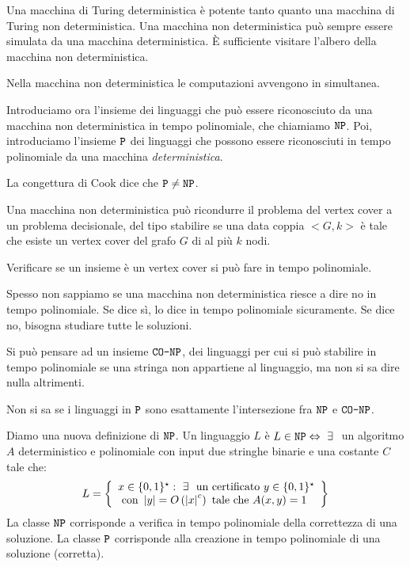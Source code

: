 Una macchina di Turing deterministica \`e potente tanto quanto una macchina di Turing non deterministica. Una macchina non deterministica pu\`o sempre essere simulata da una macchina deterministica. \`E sufficiente visitare l'albero della macchina non deterministica.

Nella macchina non deterministica le computazioni avvengono in simultanea.

Introduciamo ora l'insieme dei linguaggi che pu\`o essere riconosciuto da una macchina non deterministica in tempo polinomiale, che chiamiamo $\texttt{NP}$. Poi, introduciamo l'insieme $\texttt{P}$ dei linguaggi che possono essere riconosciuti in tempo polinomiale da una macchina \emph{deterministica}.

La congettura di Cook dice che $\texttt{P} \neq \texttt{NP}$.

Una macchina non deterministica pu\`o ricondurre il problema del vertex cover a un problema decisionale, del tipo stabilire se una data coppia $<G,k>$ \`e tale che esiste un vertex cover del grafo $G$ di al pi\`u $k$ nodi.

Verificare se un insieme \`e un vertex cover si pu\`o fare in tempo polinomiale.

Spesso non sappiamo se una macchina non deterministica riesce a dire no in tempo polinomiale. Se dice s\`i, lo dice in tempo polinomiale sicuramente. Se dice no, bisogna studiare tutte le soluzioni.

Si pu\`o pensare ad un insieme $\texttt{CO-NP}$, dei linguaggi per cui si pu\`o stabilire in tempo polinomiale se una stringa non appartiene al linguaggio, ma non si sa dire nulla altrimenti.

Non si sa se i linguaggi in $\texttt{P}$ sono esattamente l'intersezione fra $\texttt{NP}$ e $\texttt{CO-NP}$.

Diamo una nuova definizione di $\texttt{NP}$. Un linguaggio $L$ \`e $L \in \code{NP} \iff \exists$ un algoritmo $A$ deterministico e polinomiale con input due stringhe binarie e una costante $C$ tale che:
\[
L = \left\{ 
\begin{array}{l}
x \in \{0,1\}^{\star} : \exists \text{ un certificato } y \in \{0,1\}^{\star} \\
\text{ con } \abs{y} = O \left( \abs{x}^c \right) \text{ tale che } A (x, y) = 1 
\end{array}
\right\}
\]
La classe $\texttt{NP}$ corrisponde a verifica in tempo polinomiale della correttezza di una soluzione. La classe $\texttt{P}$ corrisponde alla creazione in tempo polinomiale di una soluzione (corretta).

